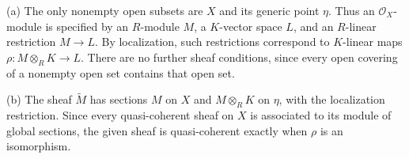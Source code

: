 (a) The only nonempty open subsets are $X$ and its generic point $\eta$. Thus an $\mathcal O_X$-module is specified by an $R$-module $M$, a $K$-vector space $L$, and an $R$-linear restriction $M\to L$. By localization, such restrictions correspond to $K$-linear maps $\rho:M\otimes_RK\to L$. There are no further sheaf conditions, since every open covering of a nonempty open set contains that open set.

(b) The sheaf $\widetilde M$ has sections $M$ on $X$ and $M\otimes_RK$ on $\eta$, with the localization restriction. Since every quasi-coherent sheaf on $X$ is associated to its module of global sections, the given sheaf is quasi-coherent exactly when $\rho$ is an isomorphism.
